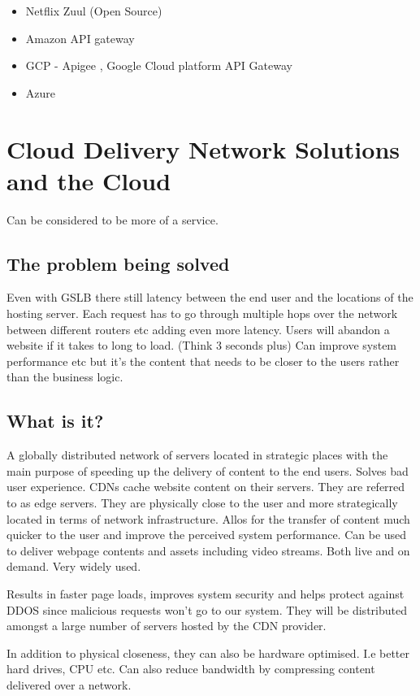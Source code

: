 \begin{itemize}
    \item Netflix Zuul (Open Source)
    \item Amazon API gateway
    \item GCP - Apigee , Google Cloud platform API Gateway
    \item Azure
\end{itemize}


\section{Cloud Delivery Network Solutions and the Cloud}
Can be considered to be more of a service.

\subsection{The problem being solved}
Even with GSLB there still latency between the end user and the locations of the hosting server.
Each request has to go through multiple hops over the network between different routers etc adding even more latency.
Users will abandon a website if it takes to long to load.
(Think 3 seconds plus)
Can improve system performance etc but it's the content that needs to be closer to the users rather than the business logic.

\subsection{What is it?}
A globally distributed network of servers located in strategic places with the main purpose of speeding up the delivery of content to the end users.
Solves bad user experience.
CDNs cache website content on their servers.
They are referred to as edge servers.
They are physically close to the user and more strategically located in terms of network infrastructure.
Allos for the transfer of content much quicker to the user and improve the perceived system performance.
Can be used to deliver webpage contents and assets including video streams.
Both live and on demand.
Very widely used.

Results in faster page loads, improves system security and helps protect against DDOS since malicious requests won't go to our system.
They will be distributed amongst a large number of servers hosted by the CDN provider.

In addition to physical closeness, they can also be hardware optimised.
I.e better hard drives, CPU etc.
Can also reduce bandwidth by compressing content delivered over a network.

